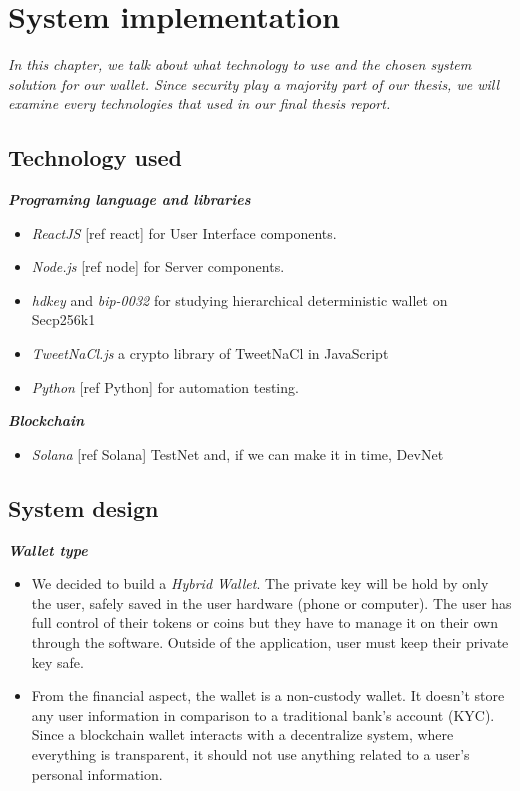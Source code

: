 \chapter{System implementation} \label{chap:System_implementation}
\textit{In this chapter, we talk about what technology to use and the chosen system solution for our wallet. Since security play a majority part of our thesis, we will examine every technologies that used in our final thesis report.}
\minitoc

\section{Technology used}
{\textit {\textbf{Programing language and libraries}}}
\begin{itemize}
\item \emph{ReactJS} [ref react] for User Interface components. 
\item \emph{Node.js} [ref node] for Server components.
\item \emph{hdkey} and \emph{bip-0032} for studying hierarchical deterministic wallet on Secp256k1
\item \emph{TweetNaCl.js} a crypto library of TweetNaCl in JavaScript
\item \emph{Python} [ref Python] for automation testing.
\end{itemize}

{\textit {\textbf{Blockchain}}}
\begin{itemize}
    \item \emph{Solana} [ref Solana] TestNet and, if we can make it in time, DevNet
\end{itemize}

\section{System design}
{\textit {\textbf{Wallet type}}}
\begin{itemize}
    \item We decided to build a \emph{Hybrid Wallet}. The private key will be hold by only the user, safely saved in the user hardware (phone or computer). The user has full control of their tokens or coins but they have to manage it on their own through the software. Outside of the application, user must keep their private key safe.
    \item From the financial aspect, the wallet is a non-custody wallet. It doesn't store any user information in comparison to a traditional bank's account (KYC). Since a blockchain wallet interacts with a decentralize system, where everything is transparent, it should not use anything related to a user's personal information.
\end{itemize}

